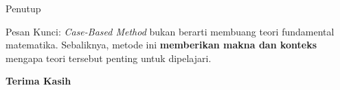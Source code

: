 \documentclass[aspectratio=169]{beamer} %
\begin{document}
\begin{frame}{Penutup}
    
	\begin{block}{Pesan Kunci:}
        \textit{Case-Based Method} bukan berarti membuang teori fundamental matematika. Sebaliknya, metode ini \textbf{memberikan makna dan konteks} mengapa teori tersebut penting untuk dipelajari.
	\end{block}
    
    \vspace{0.5cm}
    \centering
    \textbf{Terima Kasih}
\end{frame}
\end{document}
